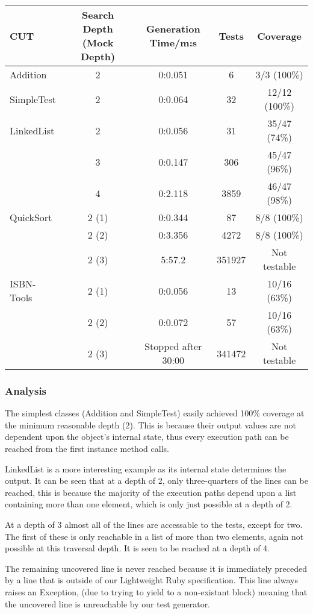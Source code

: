     \begin{tabular}{|l|cccc|}
\hline
\textbf{CUT} & \textbf{Search Depth (Mock Depth)} & \textbf{Generation Time/m:s} & \textbf{Tests} & \textbf{Coverage} \\
\hline
Addition & 2 & 0:0.051 & 6 & 3/3 (100\%) \\
\hline
SimpleTest & 2 & 0:0.064 & 32 & 12/12 (100\%) \\
\hline
LinkedList & 2 & 0:0.056 & 31 & 35/47 (74\%) \\
& 3 & 0:0.147 & 306 & 45/47 (96\%) \\
& 4 & 0:2.118 & 3859 & 46/47 (98\%)\\
\hline
QuickSort & 2 (1) & 0:0.344 & 87 & 8/8 (100\%) \\
& 2 (2) & 0:3.356 & 4272 & 8/8 (100\%) \\
& 2 (3) & 5:57.2 & 351927 & Not testable\\
\hline
ISBN-Tools & 2 (1) & 0:0.056 & 13 & 10/16 (63\%) \\
& 2 (2) & 0:0.072 & 57 & 10/16 (63\%) \\
& 2 (3) & Stopped after 30:00 & 341472 & Not testable \\
\hline
\end{tabular}

\subsubsection{Analysis}
  The simplest classes (Addition and SimpleTest) easily achieved 100\% coverage at the minimum reasonable depth (2). This is because their output values are not dependent upon the object's internal state, thus every execution path can be reached from the first instance method calls.

  LinkedList is a more interesting example as its internal state determines the output. It can be seen that at a depth of 2, only three-quarters of the lines can be reached, this is because the majority of the execution paths depend upon a list containing more than one element, which is only just possible at a depth of 2.

  At a depth of 3 almost all of the lines are accessable to the tests, except for two. The first of these is only reachable in a list of more than two elements, again not possible at this traversal depth. It is seen to be reached at a depth of 4.

  The remaining uncovered line is never reached because it is immediately preceded by a line that is outside of our Lightweight Ruby specification. This line always raises an Exception, (due to trying to yield to a non-existant block) meaning that the uncovered line is unreachable by our test generator.

